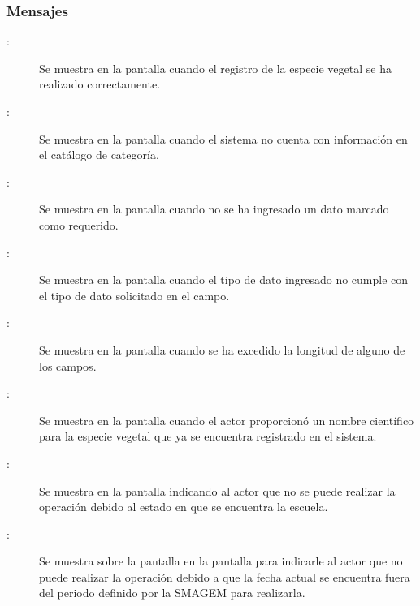 \subsubsection{Mensajes}

    \begin{description}
      
	    \item [:] Se muestra en la pantalla  cuando el registro de la especie vegetal se ha realizado correctamente.	    
	    
	    \item [:] Se muestra en la pantalla  cuando el sistema no cuenta con información en el catálogo de categoría.
	    
	    \item [:] Se muestra en la pantalla  cuando no se ha ingresado un dato marcado como requerido.
	    
	     \item [:] Se muestra en la pantalla  cuando el tipo de dato ingresado no cumple con el tipo de dato solicitado en el campo.
	    
	    \item [:] Se muestra en la pantalla  cuando se ha excedido la longitud de alguno de los campos.
	    
	     \item [:] Se muestra en la pantalla  cuando el actor proporcionó un nombre científico  para la especie vegetal que ya se encuentra registrado en el sistema.
	     
	     	     \item[:] Se muestra en la pantalla  indicando al actor que no se puede realizar la operación debido al estado en que se encuentra la escuela.
	   
	   \item [:] Se muestra sobre la pantalla en la pantalla  para indicarle al actor que no puede realizar la operación debido a que la fecha actual se encuentra fuera del periodo definido por la SMAGEM para realizarla.
	    
    \end{description}
